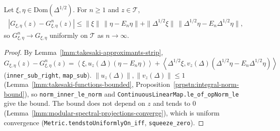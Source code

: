 \begin{lemma}
    \label{lmm:takesaki-approximants-uniform}
    \leanok
    Let $\xi, \eta \in \text{Dom}(\Delta^{1/2})$. For $n \ge 1$ and $z \in \mathcal{T}$,
    \begin{align}
        |G_{\xi,\eta}(z) - G^n_{\xi,\eta}(z)| \le \|\xi\|\,\|\eta - E_n\eta\| + \|\Delta^{1/2}\xi\|\,\|\Delta^{1/2}\eta - E_n\Delta^{1/2}\eta\|,
    \end{align}
    so $G^n_{\xi,\eta} \to G_{\xi,\eta}$ uniformly on $\mathcal{T}$ as $n \to \infty$.
\end{lemma}
\begin{proof}
    \leanok
    By Lemma~\ref{lmm:takesaki-approximants-strip}, $G_{\xi,\eta}(z) - G^n_{\xi,\eta}(z) = \left< \xi, u_z(\Delta)(\eta - E_n\eta) \right> + \left< \Delta^{1/2}\xi, v_z(\Delta)(\Delta^{1/2}\eta - E_n\Delta^{1/2}\eta) \right>$ (\texttt{inner\_sub\_right}, \texttt{map\_sub}). $\|u_z(\Delta)\|, \|v_z(\Delta)\| \le 1$ (Lemma~\ref{lmm:takesaki-functions-bounded}, Proposition~\ref{prpstn:integral-norm-bound}), so \texttt{norm\_inner\_le\_norm} and \texttt{ContinuousLinearMap.le\_of\_opNorm\_le} give the bound. The bound does not depend on $z$ and tends to $0$ (Lemma~\ref{lmm:modular-spectral-projections-converge}), which is uniform convergence (\texttt{Metric.tendstoUniformlyOn\_iff}, \texttt{squeeze\_zero}).
\end{proof}

